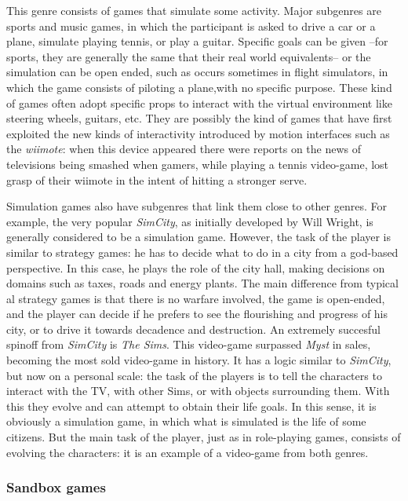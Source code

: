 \documentclass[
		twoside,openright,titlepage,numbers=noenddot,manychapters,
		headinclude,%
                footinclude=false,cleardoublepage=empty,
                BCOR=5mm,
		fontsize=11pt, %
                 enabledeprecatedfontcommands]{scrreprt}
\begin{document}
This genre consists of games that simulate some activity. Major subgenres are sports and music games, in which the participant is asked to drive a car or a plane, simulate playing tennis, or play a guitar. Specific goals can be given --for sports, they are generally the same that their real world equivalents-- or the simulation can be open ended, such as occurs sometimes in flight simulators, in which the game consists of piloting a plane,with no specific purpose.
These kind of games often adopt specific props to interact with the virtual environment like steering wheels, guitars, etc. They are possibly the kind of games that have first exploited  the new kinds of interactivity introduced by motion interfaces such as the \emph{wiimote}: when this device appeared there were reports on the news of televisions being smashed when gamers, while playing a tennis video-game, lost grasp of their wiimote in the intent of hitting a stronger  serve.

Simulation games also have subgenres that link them close to other genres. For example, the very popular \emph{SimCity}, as initially developed by Will Wright, is generally considered to be a simulation game. However, the task  of the player is similar to strategy games: he has to decide what to do in a city from a god-based perspective. In this case, he plays the role of the city hall, making decisions on domains such as taxes, roads and energy plants. The main difference from typical al strategy games is that there is no warfare involved, the game is open-ended, and the player can decide if he prefers to see the flourishing and progress of his city, or to drive it towards decadence and destruction. An extremely succesful spinoff from \emph{SimCity} is \emph{The Sims}. This video-game surpassed \emph{Myst} in sales, becoming the most sold video-game in history. It has a logic similar to \emph{SimCity}, but now on a personal scale: the task of the players is to tell the characters to interact with the TV, with other Sims, or with objects surrounding them. With this they evolve and can attempt to obtain their life goals. In this sense, it is obviously a simulation game, in which what is simulated is the life of some citizens. But the main task of the player, just as in role-playing games, consists of evolving the characters: it is an example of a video-game from both genres.

\subsubsection{Sandbox games}
\end{document}
